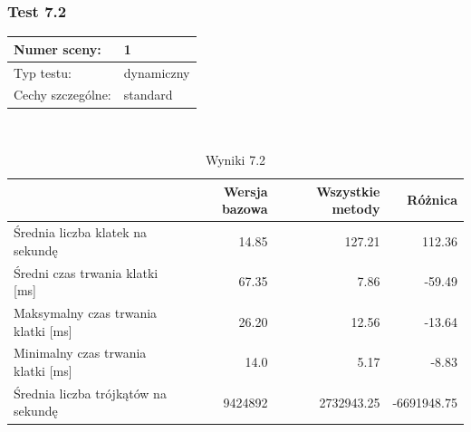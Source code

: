 \documentclass[a4paper,twoside,12pt]{book}
\begin{document}
\subsubsection{Test 7.2}
\begin{tabular}{|l||l|}
\hline
Numer sceny: & 1 \\
\hline
Typ testu: & dynamiczny \\
\hline
Cechy szczególne: & standard \\
\hline
\end{tabular}\\

\begin{table}[H]
    \centering
    \caption{Wyniki 7.2}
    \label{tab:all_test2}
    \begin{tabular}{|l||r|r|r|}
        \hline
        & Wersja bazowa & Wszystkie metody & Różnica \\
        \hline
        Średnia liczba klatek na sekundę & 14.85 & 127.21 & 112.36 \\
        \hline
        Średni czas trwania klatki [ms] & 67.35 & 7.86 & -59.49 \\
        \hline
        Maksymalny czas trwania klatki [ms] & 26.20 & 12.56 & -13.64 \\
        \hline
        Minimalny czas trwania klatki [ms] & 14.0 & 5.17 & -8.83 \\
        \hline
        Średnia liczba trójkątów na sekundę & 9424892 & 2732943.25 & -6691948.75 \\
        \hline
    \end{tabular}
\end{table}
\end{document}
